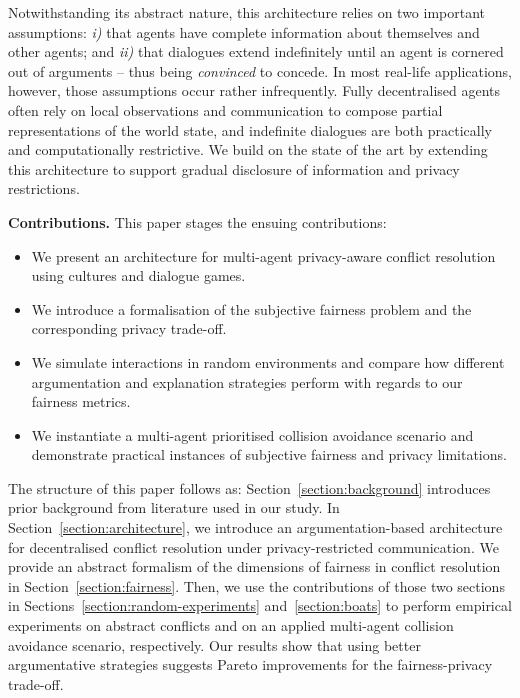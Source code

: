 \documentclass[acmsmall]{custom-arxiv}  %
\begin{document}
Notwithstanding its abstract nature, this architecture relies on two important assumptions: \textit{i)} that agents have complete information about themselves and other agents; and \textit{ii)} that dialogues extend indefinitely until an agent is cornered out of arguments -- thus being \textit{convinced} to concede. In most real-life applications, however, those assumptions occur rather infrequently. Fully decentralised agents often rely on local observations and communication to compose partial representations of the world state, and indefinite dialogues are both practically and computationally restrictive. We build on the state of the art by extending this architecture to support gradual disclosure of information and privacy restrictions.



\textbf{Contributions.} This paper stages the ensuing contributions: 
\begin{itemize}
    \item We present an architecture for multi-agent privacy-aware conflict resolution using cultures and dialogue games.
    \item We introduce a formalisation of the subjective fairness problem and the corresponding privacy trade-off.
    \item We simulate interactions in random environments and compare how different argumentation and explanation strategies perform with regards to our fairness metrics.
    \item We instantiate a multi-agent prioritised collision avoidance scenario and demonstrate practical instances of subjective fairness and privacy limitations.
\end{itemize}

The structure of this paper follows as: Section~\ref{section:background} introduces prior background from literature used in our study. In Section~\ref{section:architecture}, we introduce an argumentation-based architecture for decentralised conflict resolution under privacy-restricted communication. We provide an abstract formalism of the dimensions of fairness in conflict resolution in Section~\ref{section:fairness}. Then, we use the contributions of those two sections in Sections~\ref{section:random-experiments} and~\ref{section:boats} to perform empirical experiments on abstract conflicts and on an applied multi-agent collision avoidance scenario, respectively. Our results show that using better argumentative strategies suggests Pareto improvements for the fairness-privacy trade-off.
\end{document}
